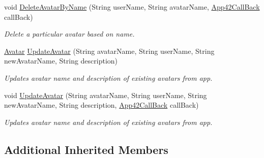 \begin{DoxyCompactItemize}
void \hyperlink{classcom_1_1shephertz_1_1app42_1_1paas_1_1sdk_1_1csharp_1_1avatar_1_1_avatar_service_a62d576249116ba6e3ec38391aeff9a06}{Delete\+Avatar\+By\+Name} (String user\+Name, String avatar\+Name, \hyperlink{interfacecom_1_1shephertz_1_1app42_1_1paas_1_1sdk_1_1csharp_1_1_app42_call_back}{App42\+Call\+Back} call\+Back)
\begin{DoxyCompactList}\small\item\em Delete a particular avatar based on name. \end{DoxyCompactList}\item 
\hyperlink{classcom_1_1shephertz_1_1app42_1_1paas_1_1sdk_1_1csharp_1_1avatar_1_1_avatar}{Avatar} \hyperlink{classcom_1_1shephertz_1_1app42_1_1paas_1_1sdk_1_1csharp_1_1avatar_1_1_avatar_service_ab34fc3af839c6f3514c409e2b901bcf1}{Update\+Avatar} (String avatar\+Name, String user\+Name, String new\+Avatar\+Name, String description)
\begin{DoxyCompactList}\small\item\em Updates avatar name and description of existing avatars from app. \end{DoxyCompactList}\item 
void \hyperlink{classcom_1_1shephertz_1_1app42_1_1paas_1_1sdk_1_1csharp_1_1avatar_1_1_avatar_service_a6029e513ee1637476abe54cf418ab217}{Update\+Avatar} (String avatar\+Name, String user\+Name, String new\+Avatar\+Name, String description, \hyperlink{interfacecom_1_1shephertz_1_1app42_1_1paas_1_1sdk_1_1csharp_1_1_app42_call_back}{App42\+Call\+Back} call\+Back)
\begin{DoxyCompactList}\small\item\em Updates avatar name and description of existing avatars from app. \end{DoxyCompactList}\end{DoxyCompactItemize}
\subsection*{Additional Inherited Members}


